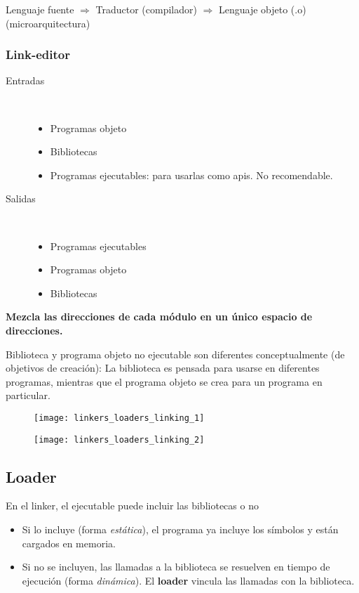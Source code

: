 \documentclass[a4paper, twoside]{article}
\begin{document}
\begin{center}
	Lenguaje fuente $\Rightarrow$ Traductor (compilador) $\Rightarrow$ Lenguaje objeto (.o) (microarquitectura)
\end{center}

\subsubsection{Link-editor}
\begin{description}
	\item[Entradas] ~
	\begin{itemize}
		\item Programas objeto
		\item Bibliotecas
		\item Programas ejecutables: para usarlas como apis. No recomendable.
	\end{itemize}

	\item[Salidas] ~
	\begin{itemize}
		\item Programas ejecutables
		\item Programas objeto
		\item Bibliotecas
	\end{itemize}
\end{description}

\textbf{Mezcla las direcciones de cada módulo en un único espacio de direcciones.}

Biblioteca y programa objeto no ejecutable son diferentes conceptualmente (de objetivos de creación):
La biblioteca es pensada para usarse en diferentes programas, mientras que el programa objeto se crea para un programa en particular.

\begin{figure}[h]
	\centering
	\texttt{[image: linkers\_loaders\_linking\_1]}
	\label{fig:linkers_loaders_linking_1}
\end{figure}

\begin{figure}[h]
	\centering
	\texttt{[image: linkers\_loaders\_linking\_2]}
	\label{fig:linkers_loaders_linking_2}
\end{figure}

\subsection{Loader}
En el linker, el ejecutable puede incluir las bibliotecas o no
\begin{itemize}
	\item Si lo incluye (forma \emph{estática}), el programa ya incluye los símbolos y están cargados en memoria.
	\item Si no se incluyen, las llamadas a la biblioteca se resuelven en tiempo de ejecución (forma \emph{dinámica}). El \textbf{loader} vincula las llamadas con la biblioteca.
\end{itemize}
	
\end{document}
